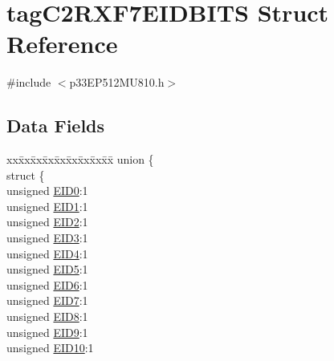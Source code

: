 \hypertarget{structtag_c2_r_x_f7_e_i_d_b_i_t_s}{}\section{tag\+C2\+R\+X\+F7\+E\+I\+D\+B\+I\+TS Struct Reference}
\label{structtag_c2_r_x_f7_e_i_d_b_i_t_s}


{\ttfamily \#include $<$p33\+E\+P512\+M\+U810.\+h$>$}

\subsection*{Data Fields}
\begin{DoxyCompactItemize}
\item 
\begin{tabbing}
xx\=xx\=xx\=xx\=xx\=xx\=xx\=xx\=xx\=\kill
union \{\\
\>struct \{\\
\>\>unsigned \hyperlink{structtag_c2_r_x_f7_e_i_d_b_i_t_s_a9da8b7b30247e4f9cd8cc056549aa9fd}{EID0}:1\\
\>\>unsigned \hyperlink{structtag_c2_r_x_f7_e_i_d_b_i_t_s_afd6c139491d147c1262f3d051c6691e9}{EID1}:1\\
\>\>unsigned \hyperlink{structtag_c2_r_x_f7_e_i_d_b_i_t_s_a36ec62d8d3c5acd5d15e6691dc099a94}{EID2}:1\\
\>\>unsigned \hyperlink{structtag_c2_r_x_f7_e_i_d_b_i_t_s_ab895f7d0ac289a0383b607cbc62eebe2}{EID3}:1\\
\>\>unsigned \hyperlink{structtag_c2_r_x_f7_e_i_d_b_i_t_s_a136d5a709d6618d40acceccb43036656}{EID4}:1\\
\>\>unsigned \hyperlink{structtag_c2_r_x_f7_e_i_d_b_i_t_s_a8dffb2d86a6c184df505ae7c71a58710}{EID5}:1\\
\>\>unsigned \hyperlink{structtag_c2_r_x_f7_e_i_d_b_i_t_s_af8a8574102515d8f1a4b7fd1685d0532}{EID6}:1\\
\>\>unsigned \hyperlink{structtag_c2_r_x_f7_e_i_d_b_i_t_s_a84c3262e67f8d5fd387ac10bde6fa9b1}{EID7}:1\\
\>\>unsigned \hyperlink{structtag_c2_r_x_f7_e_i_d_b_i_t_s_acca25e0b7d86eb499d01f85222baea87}{EID8}:1\\
\>\>unsigned \hyperlink{structtag_c2_r_x_f7_e_i_d_b_i_t_s_ac6748f73d4ada8538b06548be4f396c2}{EID9}:1\\
\>\>unsigned \hyperlink{structtag_c2_r_x_f7_e_i_d_b_i_t_s_a9cea8e77ecbb72bd3b08102412793725}{EID10}:1\\

\end{tabbing}
\end{DoxyCompactItemize}
